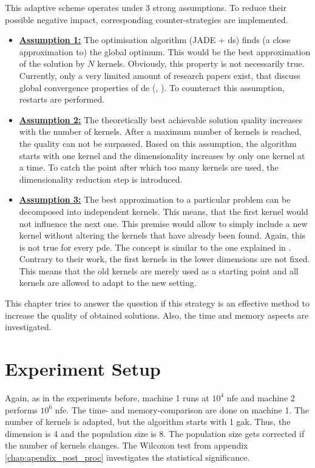 \documentclass[./\jobname.tex]{subfiles}
\begin{document}
This adaptive scheme operates under 3 strong assumptions. To reduce their possible negative impact, corresponding counter-strategies are implemented. 
\begin{itemize}
	\item \underline{\textbf{Assumption 1:}} The optimisation algorithm (JADE + \gls{ds}) finds (a close approximation to) the global optimum. This would be the best approximation of the solution by $N$ kernels. Obviously, this property is not necessarily true. Currently, only a very limited amount of research papers exist, that discuss global convergence properties of \gls{de} (\cite{hu_sufficient_2013}, \cite{opara_differential_2019}). To counteract this assumption, restarts are performed. 
	\item \underline{\textbf{Assumption 2:}} The theoretically best achievable solution quality increases with the number of kernels. After a maximum number of kernels is reached, the quality can not be surpassed. Based on this assumption, the algorithm starts with one kernel and the dimensionality increases by only one kernel at a time. To catch the point after which too many kernels are used, the dimensionality reduction step is introduced. 
	\item \underline{\textbf{Assumption 3:}} The best approximation to a particular problem can be decomposed into independent kernels. This means, that the first kernel would not influence the next one. This premise would allow to simply include a new kernel without altering the kernels that have already been found. Again, this is not true for every \gls{pde}. The concept is similar to the one explained in \cite{chaquet_solving_2012}. Contrary to their work, the first kernels in the lower dimensions are not fixed. This means that the old kernels are merely used as a starting point and all kernels are allowed to adapt to the new setting. 
\end{itemize} 

This chapter tries to answer the question if this strategy is an effective method to increase the quality of obtained solutions. Also, the time and memory aspects are investigated. 

\section{Experiment Setup}

Again, as in the experiments before, machine 1 runs at $10^4$ \gls{nfe} and machine 2 performs $10^6$ \gls{nfe}. The time- and memory-comparison are done on machine 1. The number of kernels is adapted, but the algorithm starts with 1 \gls{gak}. Thus, the dimension is 4 and the population size is 8. The population size gets corrected if the number of kernels changes. The Wilcoxon test from appendix \ref{chap:apendix_post_proc} investigates the statistical significance. 
\end{document}
